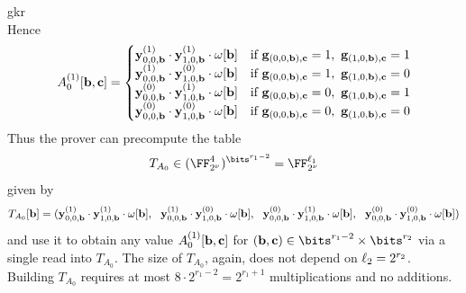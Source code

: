\begin{lncsappendix}{gkr}
$$$$
Hence
%
$$
A_0^{(1)}[\bb,\cc] = \begin{cases}
    \yy_{0,0,\bb}^{(1)} \cdot  \yy_{1,0,\bb}^{(1)} \cdot \omega[\bb]&\text{if } \bfg_{(0,0,\bb),\cc}=1,\ \bfg_{(1,0,\bb),\cc}=1 \\  
    \yy_{0,0,\bb}^{(1)} \cdot  \yy_{1,0,\bb}^{(0)}\cdot \omega[\bb]&\text{if } \bfg_{(0,0,\bb),\cc}=1,\ \bfg_{(1,0,\bb),\cc}=0\\
     \yy_{0,0,\bb}^{(0)} \cdot  \yy_{1,0,\bb}^{(1)}\cdot \omega[\bb]& \text{if } \bfg_{(0,0,\bb),\cc}=0,\ \bfg_{(1,0,\bb),\cc}=1 \\
    \yy_{0,0,\bb}^{(0)} \cdot  \yy_{1,0,\bb}^{(0)} \cdot  \omega[\bb] &\text{if } \bfg_{(0,0,\bb),\cc}= 0,\  \bfg_{(1,0,\bb),\cc}=0
\end{cases}
$$
%
Thus the prover can precompute the table $$T_{A_0} \in (\comfield^{4})^{\bits^{r_1-2}}=\comfield^{\codedim_1}$$ given by $$T_{A_0}[\bb]=(\yy_{0,0,\bb}^{(1)} \cdot  \yy_{1,0,\bb}^{(1)} \cdot \omega[\bb],  \ \
    \yy_{0,0,\bb}^{(1)} \cdot  \yy_{1,0,\bb}^{(0)}\cdot \omega[\bb],   \ \ \yy_{0,0,\bb}^{(0)} \cdot  \yy_{1,0,\bb}^{(1)}\cdot \omega[\bb],   \ \ \yy_{0,0,\bb}^{(0)} \cdot  \yy_{1,0,\bb}^{(0)} \cdot  \omega[\bb])$$
and use it to obtain any value $A_{0}^{(1)}[\mathbf{b},\mathbf{c}]$ for $(\bb,\cc)\in \bits^{r_1-2}\times \bits^{r_2}$ via a single read into $T_{A_0}$. %
%
The size of $T_{A_0}$, again, does not depend on $\ell_2=2^{r_2}$. Building $T_{A_0}$ requires at most $8\cdot 2^{r_1-2} = 2^{r_1+1}$ multiplications and no additions. 


\end{lncsappendix}
